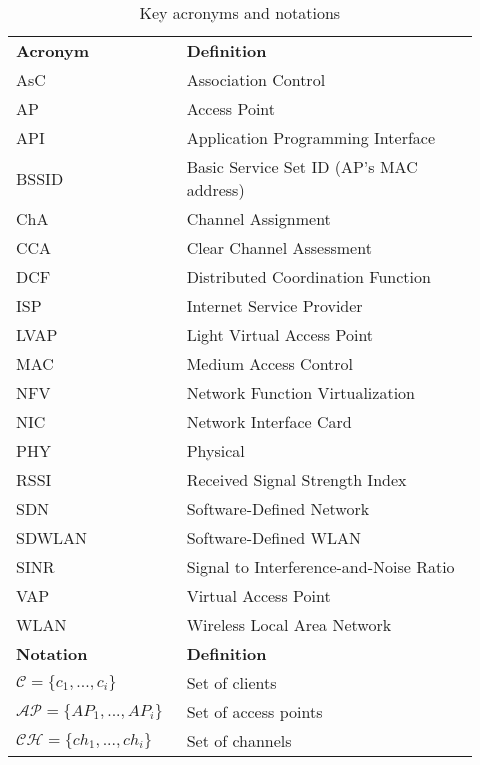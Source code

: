 \begin{table}
	\centering
	\caption{Key acronyms and notations}
	\label{acronyme-table} 
	\def\arraystretch{1}
	\begin{tabular}{ m{0.32\linewidth}m{0.6\linewidth} }
		\Xhline{1\arrayrulewidth}
		\textbf{Acronym} & \textbf{Definition} \\
		\Xhline{1\arrayrulewidth}
		AsC & Association Control\\		
		AP & Access Point\\
		API & Application Programming Interface \\
		BSSID& Basic Service Set ID (AP's MAC address)\\
		ChA & Channel Assignment\\		
		CCA& Clear Channel Assessment\\
		DCF & Distributed Coordination Function \\
		ISP & Internet Service Provider \\
		LVAP&Light Virtual Access Point\\
		MAC & Medium Access Control   \\
		NFV&Network Function Virtualization\\
		NIC&Network Interface Card\\
	    PHY & Physical \\
	    RSSI&Received Signal Strength Index\\	
	    SDN&Software-Defined Network\\
	    SDWLAN & Software-Defined WLAN \\
	    SINR & Signal to Interference-and-Noise Ratio \\
	    VAP&Virtual Access Point\\
	    WLAN & Wireless Local Area Network \\
		\Xhline{1\arrayrulewidth}
		\Xhline{1\arrayrulewidth}		
		\textbf{Notation} & \textbf{Definition} \\
		\Xhline{1\arrayrulewidth}	    
		$\mathcal{C} = \{  c_{1}, ..., c_{i} \}$ & Set of clients \\
		$\mathcal{AP} =\{ AP_{1},...,AP_{i} \}$ & Set of access points \\
		$\mathcal{CH} =\{ ch_{1},...,ch_{i} \}$ & Set of channels \\		
				

\end{tabular}
\end{table}
